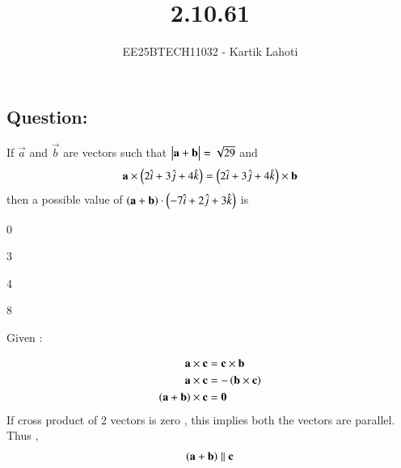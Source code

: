 \documentclass[journal]{IEEEtran}
\numberwithin{equation}{enumi}
\numberwithin{figure}{enumi}
\begin{document}

\vspace{3cm}

\title{2.10.61}
\author{EE25BTECH11032 - Kartik Lahoti}
\maketitle

\subsection*{Question: } 
If $\vec{a}$ and $\vec{b}$ are vectors such that $\begin{vmatrix}\mathbf{a} + \mathbf{b}\end{vmatrix} = \sqrt{29}$ and
\begin{align*}
    \mathbf{a} \times \left(2\hat{i} + 3\hat{j} + 4\hat{k}\right) = \left(2\hat{i} + 3\hat{j} + 4\hat{k}\right) \times \mathbf{b}
\end{align*}
then a possible value of $\left(\mathbf{a}+\mathbf{b}\right)\cdot\left(-7\hat{i} + 2\hat{j} + 3\hat{k}\right)$ is 
\begin{enumerate}
    \begin{multicols}{4}
    \item 0
    \item 3
    \item 4
    \item 8
    \end{multicols}
\end{enumerate}
\solution 

Given : 
\begin{table}[H]
    \centering
    
    \caption*{}
    \label{tab:placeholder_1}
\end{table}
\begin{align}
    \mathbf{a} \times \mathbf{c} &= \mathbf{c} \times \mathbf{b}\\
    \mathbf{a} \times \mathbf{c} &= - \left(\mathbf{b} \times \mathbf{c}\right) \\
    \left(\mathbf{a} + \mathbf{b}\right) \times \mathbf{c} &= \mathbf{0}  
\end{align}
If cross product of 2 vectors is zero ,  this implies both the vectors are parallel. 
Thus , 
\begin{align}
    \left(\mathbf{a} + \mathbf{b}\right) \parallel \mathbf{c} 
\end{align}
\end{document}
